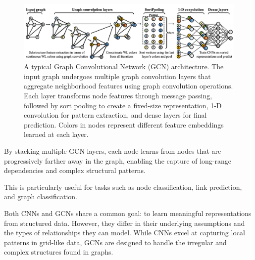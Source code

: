 \documentclass{article}
\begin{document}
\begin{figure}[h]
      \centering
      \includegraphics[width=1.0\textwidth]{../assets/gcn_architecture.png}
      \caption{A typical Graph Convolutional Network (GCN) architecture. The input graph undergoes multiple graph convolution layers that aggregate neighborhood features using graph convolution operations. Each layer transforms node features through message passing, followed by sort pooling to create a fixed-size representation, 1-D convolution for pattern extraction, and dense layers for final prediction. Colors in nodes represent different feature embeddings learned at each layer.}
      \label{fig:gcn-architecture}
\end{figure}

By stacking multiple GCN layers, each node learns from nodes that are progressively farther away in the graph, enabling the capture of long-range dependencies and complex structural patterns.

This is particularly useful for tasks such as node classification, link prediction, and graph classification.

Both CNNs and GCNs share a common goal: to learn meaningful representations from structured data.
However, they differ in their underlying assumptions and the types of relationships they can model.
While CNNs excel at capturing local patterns in grid-like data, GCNs are designed to handle the irregular and complex structures found in graphs.




\end{document}
